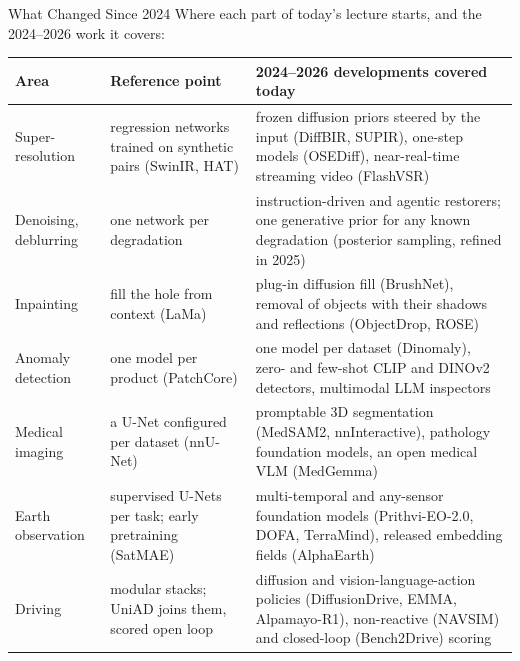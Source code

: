 \begin{frame}{What Changed Since 2024}
  Where each part of today's lecture starts, and the 2024--2026 work it covers:\par
  \vspace{0.3em}
  {\centering\scriptsize
  \begin{tabular}{>{\raggedright\arraybackslash}p{2.1cm} >{\raggedright\arraybackslash}p{3.7cm} >{\raggedright\arraybackslash}p{6.6cm}}
    \toprule
    \textbf{Area} & \textbf{Reference point} & \textbf{2024--2026 developments covered today} \\
    \midrule
    Super-resolution & regression networks trained on synthetic pairs (SwinIR, HAT) & frozen diffusion priors steered by the input (DiffBIR, SUPIR), one-step models (OSEDiff), near-real-time streaming video (FlashVSR) \\
    \addlinespace[0.2em]
    Denoising, deblurring & one network per degradation & instruction-driven and agentic restorers; one generative prior for any known degradation (posterior sampling, refined in 2025) \\
    \addlinespace[0.2em]
    Inpainting & fill the hole from context (LaMa) & plug-in diffusion fill (BrushNet), removal of objects with their shadows and reflections (ObjectDrop, ROSE) \\
    \addlinespace[0.2em]
    Anomaly detection & one model per product (PatchCore) & one model per dataset (Dinomaly), zero- and few-shot CLIP and DINOv2 detectors, multimodal LLM inspectors \\
    \addlinespace[0.2em]
    Medical imaging & a U-Net configured per dataset (nnU-Net) & promptable 3D segmentation (MedSAM2, nnInteractive), pathology foundation models, an open medical VLM (MedGemma) \\
    \addlinespace[0.2em]
    Earth observation & supervised U-Nets per task; early pretraining (SatMAE) & multi-temporal and any-sensor foundation models (Prithvi-EO-2.0, DOFA, TerraMind), released embedding fields (AlphaEarth) \\
    \addlinespace[0.2em]
    Driving & modular stacks; UniAD joins them, scored open loop & diffusion and vision-language-action policies (DiffusionDrive, EMMA, Alpamayo-R1), non-reactive (NAVSIM) and closed-loop (Bench2Drive) scoring \\
    \bottomrule
  \end{tabular}\par}
\end{frame}

